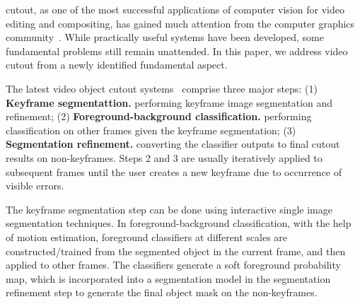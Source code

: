 \documentclass[10pt,journal,compsoc]{newIEEEtran}
\begin{document}
 cutout, as one of the most successful applications of computer vision for video editing and compositing, has gained much attention from the computer graphics community~\cite{chuang2002video,agarwala2004keyframe,Li05VideoGCut_SIGGRAPH,Wang05IVC_SIGGRAPH,Bai09VideoSnapCut_SIGGRAPH,Zhong2012UDC_SIGGRAPHAsia}. While practically useful systems have been developed, some fundamental problems still remain unattended. In this paper, we address video cutout from a newly identified fundamental aspect. 

The latest video object cutout systems~\cite{Bai09VideoSnapCut_SIGGRAPH,bai2010dynamic,zhong2010transductive,Zhong2012UDC_SIGGRAPHAsia,Fan2015JumpCut} comprise three major steps: (1)  \textbf{Keyframe segmentattion.} performing keyframe image segmentation and refinement; (2) \textbf{Foreground-background classification.} performing classification on other frames given the keyframe segmentation; (3)  \textbf{Segmentation refinement.} converting the classifier outputs to final cutout results on non-keyframes. Steps 2 and 3 are usually iteratively applied to subsequent frames until the user creates a new keyframe due to occurrence of visible errors.  

The keyframe segmentation step can be done using interactive single image segmentation techniques. In foreground-background classification, with the help of motion estimation, foreground classifiers at different scales are constructed/trained from the segmented object in the current frame, and then applied to other frames. The classifiers generate a soft foreground probability map, which is incorporated into a segmentation model in the segmentation refinement step to generate the final object mask on the non-keyframes. 
\end{document}

